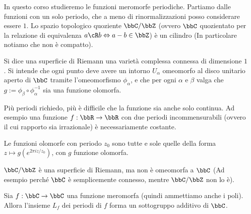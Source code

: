 
In questo corso studieremo le funzioni meromorfe periodiche.  Partiamo dalle funzioni con un solo periodo, che a meno di rinormalizzazioni posso considerare essere $1$.  Lo spazio topologico quoziente $\bbC / \bbZ$ (ovvero $\bbC$ quozientato per la relazione di equivalenza $a \cR b \sse a-b \in \bbZ$) è un cilindro (In particolare notiamo che non è compatto).

\begin{definizione}
  Si dice una superficie di Riemann una varietà complessa connessa di dimensione $1$.  Si intende che ogni punto deve avere un intorno $U_\alpha$ omeomorfo al disco unitario aperto di $\bbC$ tramite l'omeomorfismo $\phi_\alpha$, e che per ogni $\alpha$ e $\beta$ valga che $g := \phi_\beta \circ \phi_\alpha^{-1}$ sia una funzione olomorfa.
\end{definizione}


\begin{osservazione}
  Più periodi richiedo, più è difficile che la funzione sia anche solo continua. Ad esempio una funzione $f: \bbR \rar \bbR$ con due periodi incommensurabili (ovvero il cui rapporto sia irrazionale) è necessariamente costante.
\end{osservazione}

\begin{esercizio}
  Le funzioni olomorfe con periodo $z_0$ sono tutte e sole quelle della
  forma $z \mapsto g(e^{2\pi i z/z_0})$, con $g$ funzione olomorfa.
\end{esercizio}

\begin{osservazione}
  $\bbC / \bbZ$ è una superficie di Riemann, ma non è omeomorfa a $\bbC$ (Ad esempio perché $\bbC$ è semplicemente connesso, mentre $\bbC / \bbZ$ non lo è).
\end{osservazione}

\begin{lemma}
  Sia $f: \bbC \rar \bbC$ una funzione meromorfa (quindi ammettiamo anche i poli).  Allora l'insieme $L_f$ dei periodi di $f$ forma un sottogruppo additivo di $\bbC$.

\end{lemma}

